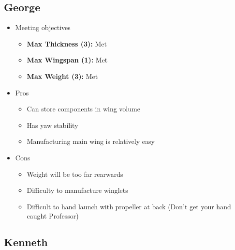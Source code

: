        
    \subsection{George}
        \begin{itemize}
            \item Meeting objectives
            \begin{itemize}
                \item \textbf{Max Thickness (3):} Met
                \item \textbf{Max Wingspan (1):} Met
                \item \textbf{Max Weight (3):} Met
            \end{itemize}
            \item Pros
            \begin{itemize}
                \item Can store components in wing volume
                \item Has yaw stability
                \item Manufacturing main wing is relatively easy
            \end{itemize}
            \item Cons
            \begin{itemize}
                \item Weight will be too far rearwards
                \item Difficulty to manufacture winglets
                \item Difficult to hand launch with propeller at back (Don't get your hand caught Professor)
            \end{itemize}
        \end{itemize}
    \subsection{Kenneth}
        

